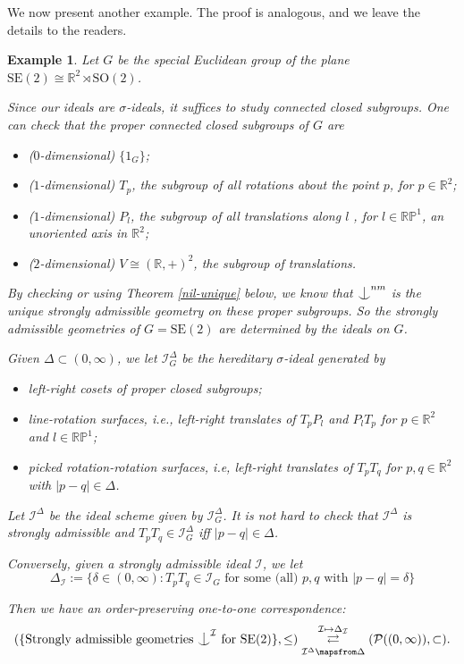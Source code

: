 \documentclass{article}
\newtheorem{example}[definition]{Example}
\newcommand{\R}{\mathbb{R}}
\newcommand{\I}{\mathcal{I}}
\newcommand{\SO}{\mathrm{SO}}
\newcommand{\RP}{\mathbb{RP}}
\newcommand{\ind}{\mathrel{\raise0.2ex\hbox{\ooalign{\hidewidth$\vert$\hidewidth\cr\raise-0.9ex\hbox{$\smile$}}}}}
\begin{document}
We now present another example. The proof is analogous, and we leave the details to the readers.

\begin{example}\label{se2}
Let $G$ be the special Euclidean group of the plane $\mathrm{SE(2)}\cong \R^2\rtimes \SO(2)$.

Since our ideals are $\sigma$-ideals, it suffices to study connected closed subgroups. One can check that the proper connected closed subgroups of $G$ are
\begin{itemize}
\item ($0$-dimensional) $\{1_G\}$;

\item ($1$-dimensional) $T_p$, the subgroup of all rotations about the point $p$, for $p\in \R^2$;

\item ($1$-dimensional) $P_l$, the subgroup of all translations along $l$ , for $l\in \RP^1$, an unoriented axis in $\R^2$;

\item ($2$-dimensional) $V\cong (\R,+)^2$, the subgroup of translations.
\end{itemize}

By checking or using Theorem \ref{nil-unique} below, we know that $\ind^{nm}$ is the unique strongly admissible geometry on these proper subgroups. So the strongly admissible geometries of $G=\mathrm{SE}(2)$ are determined by the ideals on $G$.

Given $\Delta\subset(0,\infty)$, we let $\I^\Delta_G$ be the hereditary $\sigma$-ideal generated by

\begin{itemize}
\item left-right cosets of proper closed subgroups;

\item line-rotation surfaces, i.e., left-right translates of $T_p P_l$ and $P_lT_p$ for $p\in \R^2$ and $l\in \RP^1$;

\item picked rotation-rotation surfaces, i.e, left-right translates of $T_pT_q$ for $p,q\in \R^2$ with $|p-q|\in \Delta$.
\end{itemize}

Let $\I^\Delta$ be the ideal scheme given by $\I_G^\Delta$. It is not hard to check that $\I^\Delta$ is strongly admissible and $T_pT_q\in \I_G^\Delta$ iff $|p-q|\in \Delta$.

Conversely, given a strongly admissible ideal $\I$, we let
$$\Delta_\I:=\{\delta\in (0,\infty): T_pT_q\in \I_G \text{ for some (all) } p,q \text{ with } |p-q|=\delta\}$$

Then we have an order-preserving one-to-one correspondence:
$$(\{\text{Strongly admissible geometries $\ind^\I$ for } \mathrm{SE}(2)\},\leq) \overset{\I\mapsto \Delta_\I}{\underset{\I^\Delta\mapsfrom\Delta}{\rightleftarrows}}(\mathcal{P}((0,\infty)),\subset).$$

\end{example}
\end{document}
